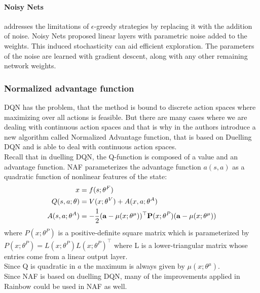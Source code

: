 \paragraph{Noisy Nets} addresses the limitations of $\epsilon$-greedy strategies by replacing it with the addition of noise. Noisy Nets \cite{NoisyNets} proposed linear layers with parametric noise added to the weights.
This induced stochasticity can aid efficient exploration.
The parameters of the noise are learned with gradient descent, along with any other remaining network weights. 

\subsubsection{Normalized advantage function}
DQN has the problem, that the method is bound to discrete action spaces where maximizing over all actions is feasible.
But there are many cases where we are dealing with continuous action spaces and that is why in \cite{NAF} the authors introduce a new algorithm called Normalized Advantage function, that is based on Duelling DQN and is able to deal with continuous action spaces.\\
Recall that in duelling DQN, the Q-function is composed of a value and an advantage function. NAF parameterizes the advantage function $a(s,a)$ as a quadratic function of nonlinear features of the state:
\begin{align*}
    x &= f(s;\theta^F)\\
    Q(s,a;\theta) &= V(x;\theta^V) + A(x, a;\theta^A)\\
    A(s,a;\theta^A) &= -\frac{1}{2}(\mathbf a-\mathbf \mu(x;\theta^{\mu}))^\top \mathbf P(x;\theta^P)(\mathbf a-\mathbf \mu(x;\theta^\mu))
\end{align*}
where $P(x;\theta^P)$ is a positive-definite square matrix which is parameterized by $P(x;\theta^P) = L(x;\theta^P)L(x;\theta^P)^\top$ where L is a lower-triangular matrix whose entries come from a linear output layer.\\
Since Q is quadratic in $a$ the maximum is always given by $\mu(x;\theta^\mu)$.\\
Since NAF is based on duelling DQN, many of the improvements applied in Rainbow could be used in NAF as well.\\

